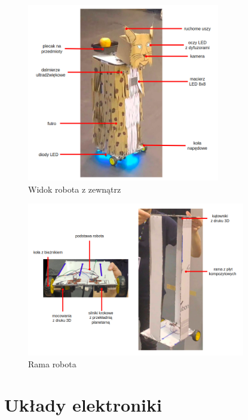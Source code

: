 \documentclass{article}
\begin{document}
        \begin{figure}[p]
            \centering
            \includegraphics[width=0.75\textwidth]{figures/full_opisy.png}
            \caption{Widok robota z zewnątrz}
            \label{full_opisy}
        \end{figure}

        \begin{figure}[p]
            \centering
            \includegraphics[width=0.85\textwidth]{figures/frame_opisy.png}
            \caption{Rama robota}
            \label{frame_opisy}
        \end{figure}

    \section{Układy elektroniki}
\end{document}
